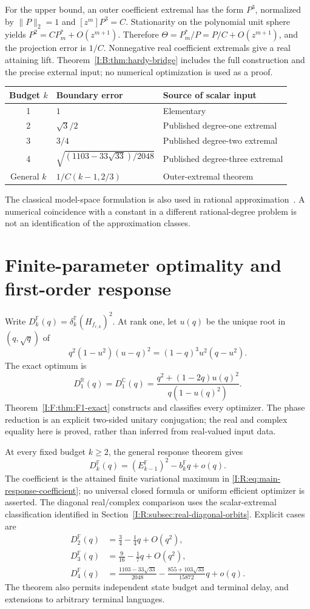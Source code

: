 For the upper bound, an outer coefficient extremal has the form
$P^3$, normalized by $\|P\|_2=1$ and $[z^m]P^3=C$.
Stationarity on the polynomial unit sphere yields
$P^2=CP_m^*+O(z^{m+1})$. Therefore
$\Theta=P_m^*/P=P/C+O(z^{m+1})$, and the projection error is $1/C$.
Nonnegative real coefficient extremals give a real attaining lift.
Theorem~\ref{I:B:thm:hardy-bridge} includes the full construction and the
precise external input; no numerical optimization is used as a proof.

\begin{center}
\begin{tabular}{cll}\toprule
Budget $k$ & Boundary error & Source of scalar input\\\midrule
1 & $1$ & Elementary\\
2 & $\sqrt3/2$ & Published degree-one extremal\\
3 & $3/4$ & Published degree-two extremal\\
4 & $\sqrt{(1103-33\sqrt{33})/2048}$ & Published degree-three extremal\\
General $k$ & $1/C(k-1,2/3)$ & Outer-extremal theorem~\cite{outer2026}\\\bottomrule
\end{tabular}
\end{center}
The classical model-space formulation is also used in rational
approximation~\citep{rational2026}. A numerical coincidence with a
constant in a different rational-degree problem is not an identification
of the approximation classes.

\section{Finite-parameter optimality and first-order response}
Write $D_k^{\mathbb F}(q)=\delta_k^{\mathbb F}(H_{f_{r,k}})^2$.
At rank one, let $u(q)$ be the unique root in $(q,\sqrt q)$ of
\[
 q^2(1-u^2)(u-q)^2=(1-q)^3u^2(q-u^2).
\]
The exact optimum is
\[
 D_1^{\mathbb R}(q)=D_1^{\mathbb C}(q)
 =\frac{q^2+(1-2q)u(q)^2}{q(1-u(q)^2)}.
\]
Theorem~\ref{I:F:thm:F1-exact} constructs and classifies every optimizer.
The phase reduction is an explicit two-sided unitary conjugation; the
real and complex equality here is proved, rather than inferred from
real-valued input data.

At every fixed budget $k\ge2$, the general response theorem gives
\[
 D_k^{\mathbb F}(q)=(E_{k-1}^{\mathbb F})^2-b_k^{\mathbb F}q+o(q).
\]
The coefficient is the attained finite variational maximum in
\eqref{I:R:eq:main-response-coefficient}; no universal closed formula or
uniform efficient optimizer is asserted. The diagonal real/complex
comparison uses the scalar-extremal classification identified in
Section~\ref{I:R:subsec:real-diagonal-orbits}. Explicit cases are
\begin{align*}
 D_2^{\mathbb F}(q)&=\frac34-\frac14q+O(q^2),\\
 D_3^{\mathbb F}(q)&=\frac9{16}-\frac17q+O(q^2),\\
 D_4^{\mathbb F}(q)&=\frac{1103-33\sqrt{33}}{2048}
       -\frac{855+103\sqrt{33}}{15872}q+o(q).
\end{align*}
The theorem also permits independent state budget and terminal delay,
and extensions to arbitrary terminal languages.

